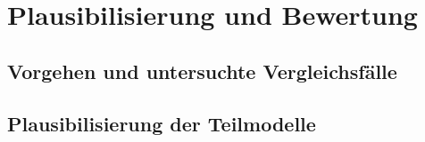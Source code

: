 \section{Plausibilisierung und Bewertung}
\label{chap:plausibilisierung_bewertung}

\subsection{Vorgehen und untersuchte Vergleichsfälle}
\label{sec:vorgehen_vergleichsfaelle}

%


\subsection{Plausibilisierung der Teilmodelle}
\label{sec:plausibilisierung_teilmodelle}

%


